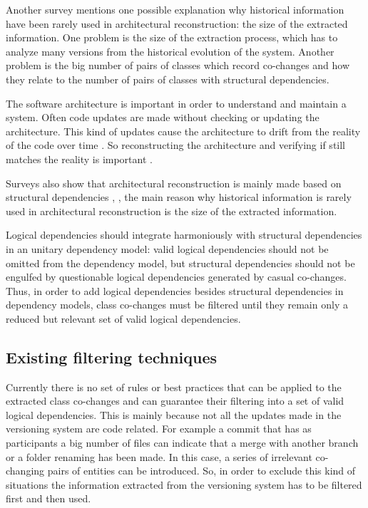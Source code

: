 Another survey \cite{Shtern:2012:CMS:2332427.2332428} mentions one possible explanation why historical information have been rarely used in architectural reconstruction: the size of the extracted information. One problem is the size of the extraction process, which has to analyze many versions from the historical evolution of the system. Another problem is the big number of pairs of classes which record co-changes and how they relate to the number of pairs of classes with structural dependencies.

The software architecture is important in order to understand and maintain a system. Often code updates are made without checking or updating the architecture. This kind of updates cause the architecture to drift from the reality of the code over time \cite{sar}.
So reconstructing the architecture and verifying if still matches the reality is important \cite{Kalliamvakou2016}. 

Surveys also show that architectural reconstruction is mainly made based on structural dependencies \cite{Shtern:2012:CMS:2332427.2332428}, \cite{sar}, the main reason why historical information is rarely used in architectural reconstruction is the size of the extracted information.

Logical dependencies should integrate harmoniously with structural dependencies in an unitary dependency model: valid logical dependencies should not be omitted from the dependency model, but structural dependencies should not be engulfed by questionable logical dependencies generated by casual co-changes.  
Thus, in order to add logical dependencies besides structural dependencies in dependency models, class co-changes must be filtered until they remain only a reduced but relevant set of valid logical dependencies. 


\subsection{Existing filtering techniques}

Currently there is no set of rules or best practices that can be applied to the extracted class co-changes and can guarantee their filtering into a set of valid logical dependencies.
This is mainly because not all the updates made in the versioning system are code related. For example a commit that has as participants a big number of files can indicate that a merge with another branch or a folder renaming has been made. In this case, a series of irrelevant co-changing pairs of entities can be introduced. So, in order to exclude this kind of situations the information extracted from the versioning system has to be filtered first and then used.



